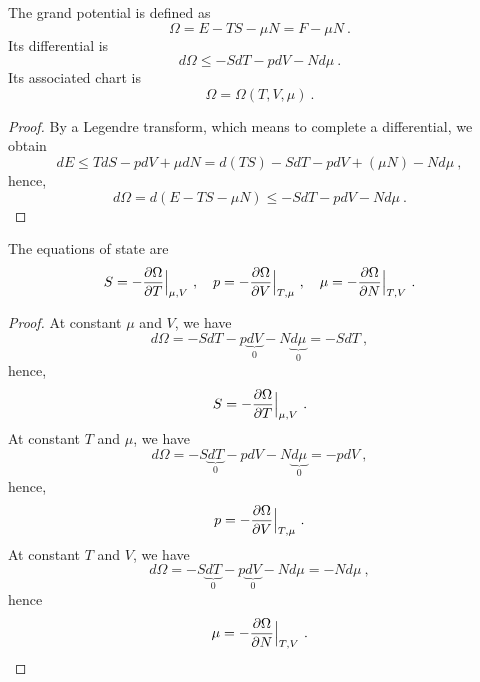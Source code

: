     The grand potential is defined as 
    \begin{equation}\label{td:o}
        \Omega = E - TS - \mu N = F - \mu N ~.
    \end{equation}
    Its differential is 
    \begin{equation}\label{td:d:o}
        d\Omega \leq - SdT - pdV - N d\mu ~.
    \end{equation}
    Its associated chart is
    \begin{equation}\label{td:coord:o}
        \Omega = \Omega(T, V, \mu) ~.
    \end{equation}
    \begin{proof}
        By a Legendre transform, which means to complete a differential, we obtain
        \begin{equation*}
            dE \leq T dS - p dV + \mu dN = d(TS) - SdT - p dV + (\mu N) - N d\mu ~,
        \end{equation*}
        hence,
        \begin{equation*}
            d\Omega = d(E - TS - \mu N) \leq - SdT - p dV - N d\mu ~.
        \end{equation*}
    \end{proof}
    The equations of state are
    \begin{equation}\label{td:es:o}
        S = - \frac{\partial\Omega}{\partial T} \Big \vert_{\mu,V} ~, \quad p = - \frac{\partial\Omega}{\partial V} \Big \vert_{T,\mu} ~, \quad \mu = - \frac{\partial\Omega}{\partial N} \Big \vert_{T,V} ~. 
    \end{equation}
    \begin{proof}
        At constant $\mu$ and $V$, we have
        \begin{equation*}
            d\Omega = - SdT - p\underbrace{dV}_0 - N \underbrace{d\mu}_0 = - S dT ~,
        \end{equation*}
        hence,
        \begin{equation*}
            S = - \frac{\partial\Omega}{\partial T} \Big \vert_{\mu,V} ~.
        \end{equation*}
        At constant $T$ and $\mu$, we have
        \begin{equation*}
            d\Omega = - S \underbrace{dT}_0 - pdV - N \underbrace{d\mu}_ 0 = - p dV ~,
        \end{equation*}
        hence,
        \begin{equation*}
            p = - \frac{\partial\Omega}{\partial V} \Big \vert_{T,\mu} ~.
        \end{equation*}
        At constant $T$ and $V$, we have
        \begin{equation*}
            d\Omega = - S\underbrace{dT}_0 - p\underbrace{dV}_0 - N d\mu = - N d\mu~,
        \end{equation*}
        hence 
        \begin{equation*}
            \mu = - \frac{\partial\Omega}{\partial N} \Big \vert_{T,V} ~.
        \end{equation*}
    \end{proof}
